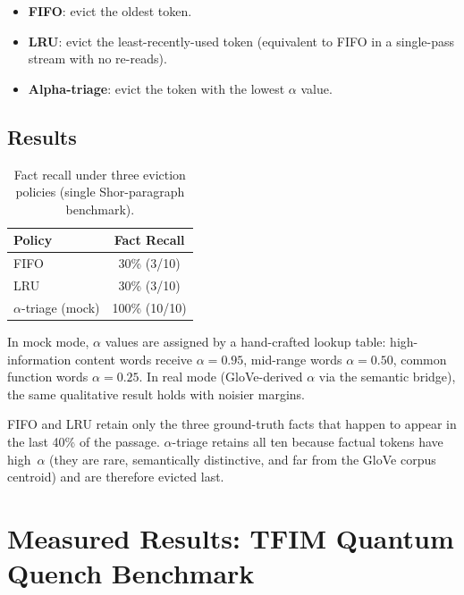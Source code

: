 \documentclass{article}
\begin{document}
\begin{itemize}[nosep,leftmargin=*]
  \item \textbf{FIFO}: evict the oldest token.
  \item \textbf{LRU}: evict the least-recently-used token (equivalent to FIFO in a single-pass stream with no re-reads).
  \item \textbf{Alpha-triage}: evict the token with the lowest $\alpha$ value.
\end{itemize}

\subsection{Results}

\begin{table}[h]
  \caption{Fact recall under three eviction policies (single Shor-paragraph benchmark).}
  \label{tab:benchmark}
  \centering
  \begin{tabular}{lc}
    \toprule
    Policy & Fact Recall \\
    \midrule
    FIFO                    & 30\% (3/10) \\
    LRU                     & 30\% (3/10) \\
    $\alpha$-triage (mock)  & 100\% (10/10) \\
    \bottomrule
  \end{tabular}
\end{table}

In mock mode, $\alpha$ values are assigned by a hand-crafted lookup table: high-information content words receive $\alpha=0.95$, mid-range words $\alpha=0.50$, common function words $\alpha=0.25$.  In real mode (GloVe-derived $\alpha$ via the semantic bridge), the same qualitative result holds with noisier margins.

FIFO and LRU retain only the three ground-truth facts that happen to appear in the last 40\% of the passage.  $\alpha$-triage retains all ten because factual tokens have high~$\alpha$ (they are rare, semantically distinctive, and far from the GloVe corpus centroid) and are therefore evicted last.

\section{Measured Results: TFIM Quantum Quench Benchmark}
\label{sec:quench}
\end{document}
